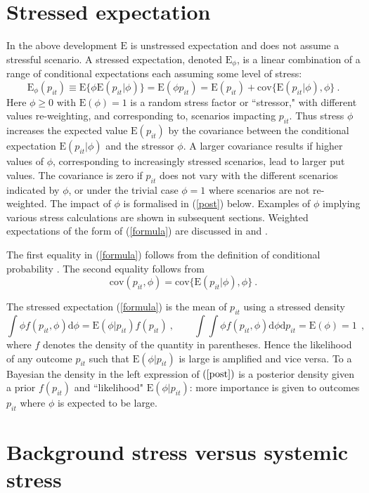 \documentclass[12pt]{article}
\newcommand{\E}{\mathrm{E}}
\newcommand{\cov}{\mathrm{cov}}
\newcommand{\Es}{\E_\phi}
\newcommand{\de}{\mathrm{d}}
\newcommand{\eref}[1]{(\ref{#1})}
\newcommand{\cq}{\ , \qquad}
\newcommand{\be}[1]{\begin{equation}\label{#1}}
\newcommand{\ee}{\end{equation}}
\begin{document}
\section{Stressed expectation}

In the above development $\E$  is  unstressed expectation and does not assume a stressful scenario.   A stressed expectation, denoted $\Es$, is a
linear combination of a range of conditional expectations each assuming some level of stress:
\be{formula}
 \Es(p_{it}) \equiv \E\{\phi\E(p_{it}|\phi)\} = \E(\phi p_{it}) = \E(p_{it}) + \cov\{\E(p_{it}|\phi),\phi\}\ .
\ee
Here $\phi\ge 0$ with $\E(\phi)=1$ is a random stress factor or ``stressor,"  with different values re-weighting, and corresponding to, scenarios impacting $p_{it}$.  Thus stress $\phi$ increases the expected value $\E(p_{it})$ by the covariance between the conditional expectation $\E(p_{it}|\phi)$  and the stressor $\phi$. A larger covariance results if higher values of $\phi$, corresponding to increasingly stressed scenarios, lead to larger put values. The covariance is zero if $p_{it}$ does not vary with the different scenarios indicated by $\phi$, or under the trivial case $\phi=1$ where scenarios are not re-weighted. The impact of $\phi$ is formalised in \eref{post} below. Examples of $\phi$ implying various stress calculations are shown in subsequent sections. Weighted expectations of the form of \eref{formula} are discussed in \cite{furman2008weighted1} and \cite{choo2010determining}.

The first equality in \eref{formula} follows from the definition of conditional probability \citep{whittle2000probability}.  The second equality follows from
$$
\cov(p_{it},\phi)=\cov\{\E(p_{it}|\phi),\phi\}\ .
$$

The stressed expectation \eref{formula}  is the mean of $p_{it}$  using a stressed density
\be{post}
\int \phi f(p_{it},\phi)\de \phi= \E(\phi|p_{it})f(p_{it})\cq \int\int \phi f(p_{it},\phi)\de \phi\de p_{it} = \E(\phi) = 1\
\  ,
\ee
where $f$ denotes the density of the quantity in parentheses.
Hence the likelihood of any outcome $p_{it}$ such that $\E(\phi|p_{it})$ is large is amplified and vice versa.   To a Bayesian the density in the left  expression of $\eref{post}$ is a posterior density given a prior $f(p_{it})$ and ``likelihood" $\E(\phi|p_{it})$: more importance is given to outcomes   $p_{it}$  where $\phi$ is expected to be large.



\section{Background stress versus systemic stress}
\end{document}
